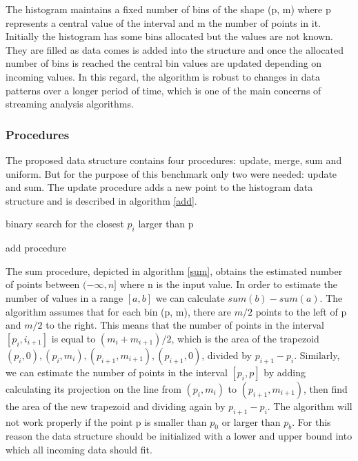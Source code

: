 \documentclass[12pt]{article}
\begin{document}
	The histogram maintains a fixed number of bins of the shape (p, m) where 
	p represents a central value of the interval and m the number of points in it.
	Initially the histogram has some bins allocated but the values are not known. 
	They are filled as data comes is added into the structure and once the allocated 
	number of bins is reached the central bin values are updated depending on incoming
	values. In this regard, the algorithm is robust to changes in data patterns over 
	a longer period of time, which is one of the main concerns of streaming analysis 
	algorithms.

	\subsubsection{Procedures}
	The proposed data structure contains four procedures: update, merge, sum and uniform.
	But for the purpose of this benchmark only two were needed: update and sum. The update 
	procedure adds a new point to the histogram data structure and is described in algorithm \ref{add}.

	\begin{algorithm}
		\label{add}
		binary search for the closest $p_i$ larger than p\;
		\caption{add procedure}
	\end{algorithm}

	The sum procedure, depicted in algorithm \ref{sum}, obtains the estimated number of points between $(-\infty, n]$ where n is 
	the input value. In order to estimate the number of values in a range $[a, b]$ we can calculate 
	$sum(b) - sum(a)$. The algorithm assumes that for each bin (p, m), there are $m/2$ points to the left of p
	and $m/2$ to the right. This means that the number of points in the interval $[p_i, i_{i+1}]$ is equal 
	to $(m_i + m_{i+1}) / 2$, which is the area of the trapezoid $(p_i, 0), (p_i, m_i), (p_{i+1}, m_{i+1}), (p_{i+1}, 0)$, 
	divided by $p_{i+1} - p_i$. Similarly, we can estimate the number of points in the 
	interval $[p_i, p]$ by adding calculating its projection on the line from $(p_i, m_i)$ to
	$(p_{i+1}, m_{i+1})$, then find the area of the new trapezoid and dividing again by $p_{i+1} - p_i$.
	The algorithm will not work properly if the point p is smaller than $p_0$ or larger than 
	$p_b$. For this reason the data structure should be initialized with a lower and upper bound
	into which all incoming data should fit.
\end{document}
